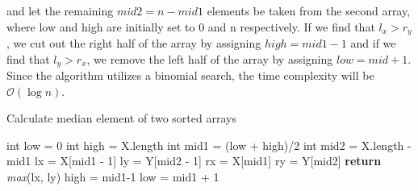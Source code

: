     	and let the remaining $ mid2 = n-mid1$ elements be taken from the second array, where low and high are initially set to 0 and n respectively. If we find that $l_x > r_y$, we cut out the right half of the array by assigning $high = mid1 - 1$ and if we find that $l_y > r_x$, we remove the left half of the array by assigning $low = mid + 1$. Since the algorithm utilizes a binomial search, the time complexity will be $\mathcal{O}(\log{}n)$.
    	\begin{algorithm}[H]
    		\caption{Calculate median element of two sorted arrays}
    		\begin{algorithmic}[1]
    			\State int low = 0
    			\State int high = X.length
	    			\State int mid1 = (low + high)/2
	    			\State int mid2 = X.length - mid1
	    			\State lx = X[mid1 - 1]
	    			\State ly = Y[mid2 - 1]
	    			\State rx = X[mid1]
	    			\State ry = Y[mid2]
	    				\State \textbf{return} \textit{max}(lx, ly)
	    					\State high = mid1-1
	    					\State low = mid1 + 1
	    			\EndIf
    			\EndWhile
    			\EndProcedure
    			
    		\end{algorithmic}
    	\end{algorithm}
